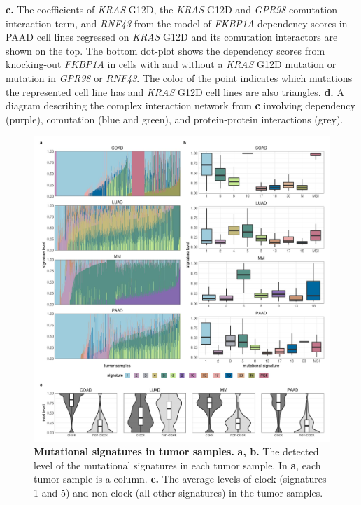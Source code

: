 \documentclass[english, 10pt, letterpaper]{article}
\newcommand{\beginsupplement}{%
        \setcounter{table}{0}
        \renewcommand{\thetable}{\arabic{table}}%
        \setcounter{figure}{0}
        \renewcommand{\thefigure}{\arabic{figure}}%
    }
\newcommand{\KRAS}{\emph{KRAS}}
\begin{document}
\textbf{c.} The coefficients of \KRAS{} G12D, the \KRAS{} G12D and \emph{GPR98} comutation interaction term, and \emph{RNF43} from the model of \emph{FKBP1A} dependency scores in PAAD cell lines regressed on \KRAS{} G12D and its comutation interactors are shown on the top. The bottom dot-plot shows the dependency scores from knocking-out \emph{FKBP1A} in cells with and without a  \KRAS{} G12D mutation or mutation in \emph{GPR98} or \emph{RNF43}. The color of the point indicates which mutations the represented cell line has and \KRAS{} G12D cell lines are also triangles.
\textbf{d.} A diagram describing the complex interaction network from \textbf{c} involving dependency (purple), comutation (blue and green), and protein-protein interactions (grey).
\newpage




\beginsupplement
\makeatletter
\renewcommand{\fnum@figure}{Supplementary \figurename~\thefigure}
\makeatother



\begin{figure}[h!]
\centering
\includegraphics[width=180mm]{figures/Supp_Fig_1.jpeg}
\caption{
    \textbf{Mutational signatures in tumor samples.}
    \textbf{a, b.} The detected level of the mutational signatures in each tumor sample. In \textbf{a}, each tumor sample is a column.
    \textbf{c.} The average levels of clock (signatures 1 and 5) and non-clock (all other signatures) in the tumor samples.
}
\label{sfig:mutational-signatures-supp}
\end{figure}
\newpage
\end{document}
